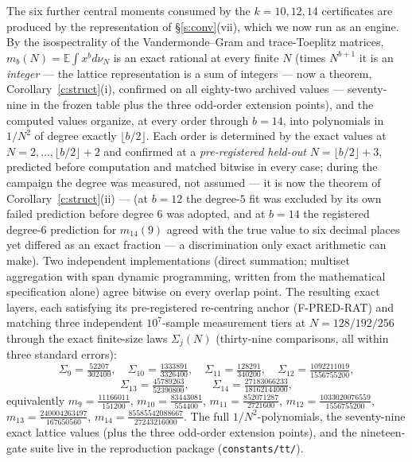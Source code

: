 \documentclass[11pt]{article}
\numberwithin{equation}{section}
\theoremstyle{definition}
\theoremstyle{remark}
\begin{document}
The six further central moments consumed by the $k=10,12,14$
certificates are produced by the representation of
\S\ref{s:conv}(vii), which we now run as an engine. By the
isospectrality of the Vandermonde--Gram and trace-Toeplitz
matrices, $m_b(N)=\mathbb E\int x^{b}d\nu_N$ is an exact
rational at every finite $N$ (times $N^{b+1}$ it is an
\emph{integer} --- the lattice representation is a sum of
integers --- now a theorem, Corollary~\ref{c:struct}(i),
confirmed on all eighty-two archived values ---
seventy-nine in the frozen table plus the three odd-order
extension points), and the
computed values organize, at every order through $b=14$, into
polynomials in $1/N^{2}$ of degree exactly
$\lfloor b/2\rfloor$. Each order is determined by the exact
values at $N=2,\dots,\lfloor b/2\rfloor+2$ and confirmed at a
\emph{pre-registered held-out} $N=\lfloor b/2\rfloor+3$,
predicted before computation and matched bitwise in every
case; during the campaign the degree was measured, not
assumed --- it is now the theorem of
Corollary~\ref{c:struct}(ii) --- (at $b=12$
the degree-$5$ fit was excluded by its own failed prediction
before degree $6$ was adopted, and at $b=14$ the registered
degree-$6$ prediction for $m_{14}(9)$ agreed with the true
value to six decimal places yet differed as an exact fraction
--- a discrimination only exact arithmetic can make). Two
independent implementations (direct summation; multiset
aggregation with span dynamic programming, written from the
mathematical specification alone) agree bitwise on every
overlap point. The resulting exact layers, each satisfying its
pre-registered re-centring anchor (F-PRED-RAT) and matching
three independent $10^{7}$-sample measurement tiers at
$N=128/192/256$ through the exact finite-size laws
$\Sigma_j(N)$ (thirty-nine comparisons, all within three
standard errors):
\[
\Sigma_9=\tfrac{52207}{302400},\quad
\Sigma_{10}=\tfrac{1333891}{3326400},\quad
\Sigma_{11}=\tfrac{128291}{340200},\quad
\Sigma_{12}=\tfrac{1092211019}{1556755200},
\]
\[
\Sigma_{13}=\tfrac{45789263}{52390800},\qquad
\Sigma_{14}=\tfrac{27183066233}{18162144000},
\]
equivalently $m_9=\tfrac{11166011}{151200}$,
$m_{10}=\tfrac{83443081}{554400}$,
$m_{11}=\tfrac{852071287}{2721600}$,
$m_{12}=\tfrac{1033020076559}{1556755200}$,
$m_{13}=\tfrac{240004263497}{167650560}$,
$m_{14}=\tfrac{85585542088667}{27243216000}$. The full
$1/N^{2}$-polynomials, the seventy-nine exact lattice values
(plus the three odd-order extension points), and
the nineteen-gate suite live in the reproduction package
(\texttt{constants/tt/}).
\end{document}
